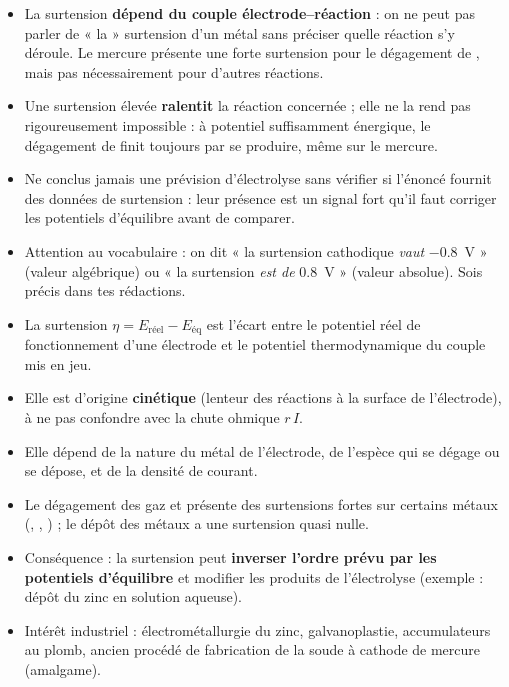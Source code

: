 \documentclass[11pt]{article}
\newcommand{\cle}[1]{{\popxbold\color{popdark}#1}}
\begin{document}
\begin{attention}
\begin{itemize}
\item La surtension \textbf{dépend du couple électrode--réaction} : on ne peut pas parler de « la » surtension d'un métal sans préciser quelle réaction s'y déroule. Le mercure présente une forte surtension pour le dégagement de , mais pas nécessairement pour d'autres réactions.
\item Une surtension élevée \textbf{ralentit} la réaction concernée ; elle ne la rend pas rigoureusement impossible : à potentiel suffisamment énergique, le dégagement de  finit toujours par se produire, même sur le mercure.
\item Ne conclus jamais une prévision d'électrolyse sans vérifier si l'énoncé fournit des données de surtension : leur présence est un signal fort qu'il faut corriger les potentiels d'équilibre avant de comparer.
\item Attention au vocabulaire : on dit « la surtension cathodique \emph{vaut} \SI{-0,8}{V} » (valeur algébrique) ou « la surtension \emph{est de} \SI{0,8}{V} » (valeur absolue). Sois précis dans tes rédactions.
\end{itemize}
\end{attention}

\begin{aretenir}
\begin{itemize}
\item La \cle{surtension} $\eta = E_{\text{réel}} - E_{\text{éq}}$ est l'écart entre le potentiel réel de fonctionnement d'une électrode et le potentiel thermodynamique du couple mis en jeu.
\item Elle est d'origine \textbf{cinétique} (lenteur des réactions à la surface de l'électrode), à ne pas confondre avec la chute ohmique $r\,I$.
\item Elle dépend de la nature du métal de l'électrode, de l'espèce qui se dégage ou se dépose, et de la densité de courant.
\item Le dégagement des gaz  et  présente des surtensions fortes sur certains métaux (, , ) ; le dépôt des métaux a une surtension quasi nulle.
\item Conséquence : la surtension peut \textbf{inverser l'ordre prévu par les potentiels d'équilibre} et modifier les produits de l'électrolyse (exemple : dépôt du zinc en solution aqueuse).
\item Intérêt industriel : électrométallurgie du zinc, galvanoplastie, accumulateurs au plomb, ancien procédé de fabrication de la soude à cathode de mercure (amalgame).
\end{itemize}
\end{aretenir}
\end{document}
